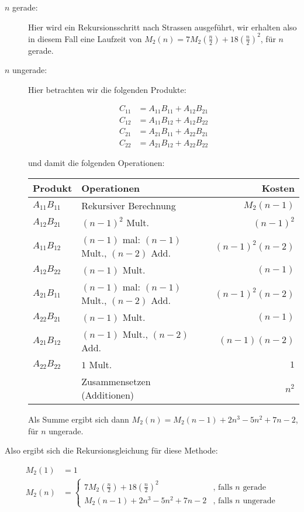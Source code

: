 \documentclass[11pt,a4paper,ngerman]{article}
\begin{document}
\begin{description}
\item[$n$ gerade:] Hier wird ein Rekursionsschritt nach Strassen ausgeführt, wir erhalten also in diesem
Fall eine Laufzeit von $M_2(n) = 7M_2(\frac{n}{2}) + 18\left(\frac{n}{2}\right)^2$, für $n$ gerade.
\item[$n$ ungerade:] Hier betrachten wir die folgenden Produkte:

\begin{equation*}\begin{split}
C_{11} &= A_{11}B_{11} + A_{12}B_{21} \\
C_{12} &= A_{11}B_{12} + A_{12}B_{22} \\
C_{21} &= A_{21}B_{11} + A_{22}B_{21} \\
C_{22} &= A_{21}B_{12} + A_{22}B_{22}
\end{split}\end{equation*}

und damit die folgenden Operationen:

\begin{tabular}{l|l||r}
Produkt & Operationen & Kosten \\
\hline \hline
$A_{11}B_{11}$ & Rekursiver Berechnung & $M_2(n-1)$ \\
$A_{12}B_{21}$ & $(n-1)^2$ Mult. & $(n-1)^2$ \\
$A_{11}B_{12}$ & $(n-1)$ mal: $(n-1)$ Mult., $(n-2)$ Add. & $(n-1)^2 (n-2)$ \\
$A_{12}B_{22}$ & $(n-1)$ Mult. & $(n-1)$ \\
$A_{21}B_{11}$ & $(n-1)$ mal: $(n-1)$ Mult., $(n-2)$ Add. & $(n-1)^2 (n-2)$ \\
$A_{22}B_{21}$ & $(n-1)$ Mult. & $(n-1)$ \\
$A_{21}B_{12}$ & $(n-1)$ Mult., $(n-2)$ Add. & $(n-1)(n-2)$ \\
$A_{22}B_{22}$ & $1$ Mult. & $1$ \\
& Zusammensetzen (Additionen)& $n^2$ 
\end{tabular}

Als Summe ergibt sich dann $M_2(n) = M_2(n-1) + 2n^3 -5n^2 +7n -2$, für $n$ ungerade.
\end{description}

Also ergibt sich die Rekursionsgleichung für diese Methode:

\begin{equation*}\begin{split}
M_2(1) &= 1 \\
M_2(n) &= \begin{cases}
            7M_2(\frac{n}{2}) + 18\left(\frac{n}{2}\right)^2 & \text{, falls $n$ gerade} \\
            M_2(n-1) + 2n^3 -5n^2 +7n -2 & \text{, falls $n$ ungerade}
         \end{cases}
\end{split}\end{equation*}
\end{document}
